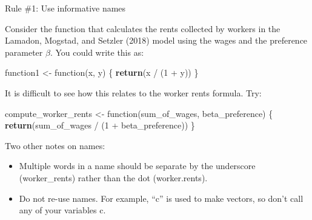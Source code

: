 \documentclass[10pt,ignorenonframetext,]{beamer}
\newenvironment{Shaded}{\begin{snugshade}}{\end{snugshade}}
\newcommand{\KeywordTok}[1]{\textcolor[rgb]{0.13,0.29,0.53}{\textbf{{#1}}}}
\newcommand{\DecValTok}[1]{\textcolor[rgb]{0.00,0.00,0.81}{{#1}}}
\newcommand{\StringTok}[1]{\textcolor[rgb]{0.31,0.60,0.02}{{#1}}}
\newcommand{\NormalTok}[1]{{#1}}
\providecommand{\tightlist}{%
\setlength{\itemsep}{0pt}\setlength{\parskip}{0pt}}
\begin{document}
\begin{frame}[fragile]{Rule \#1: Use informative names}

Consider the function that calculates the rents collected by workers in
the Lamadon, Mogstad, and Setzler (2018) model using the wages and the
preference parameter \(\beta\). You could write this as:

\footnotesize

\begin{Shaded}
\begin{Highlighting}[]
\NormalTok{function1 <-}\StringTok{ }\NormalTok{function(x, y) \{}
  \KeywordTok{return}\NormalTok{(x /}\StringTok{ }\NormalTok{(}\DecValTok{1} \NormalTok{+}\StringTok{ }\NormalTok{y))}
\NormalTok{\}}
\end{Highlighting}
\end{Shaded}

\normalsize

It is difficult to see how this relates to the worker rents formula.
Try:

\footnotesize

\begin{Shaded}
\begin{Highlighting}[]
\NormalTok{compute_worker_rents <-}\StringTok{ }\NormalTok{function(sum_of_wages, beta_preference) \{}
  \KeywordTok{return}\NormalTok{(sum_of_wages /}\StringTok{ }\NormalTok{(}\DecValTok{1} \NormalTok{+}\StringTok{ }\NormalTok{beta_preference))}
\NormalTok{\}}
\end{Highlighting}
\end{Shaded}

\normalsize

Two other notes on names:

\begin{itemize}
\tightlist
\item
  Multiple words in a name should be separate by the underscore
  (worker\_rents) rather than the dot (worker.rents).
\item
  Do not re-use names. For example, ``c'' is used to make vectors, so
  don't call any of your variables c.
\end{itemize}

\end{frame}
\end{document}
